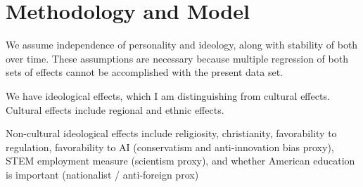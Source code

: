 \documentclass[review]{elsarticle}
\begin{document}




\section{Methodology and Model}

We assume independence of personality and ideology, along with stability of both over time.
These assumptions are necessary because multiple regression of both sets of effects cannot be accomplished with the present data set.

We have ideological effects, which I am distinguishing from cultural effects.
Cultural effects include regional and ethnic effects.

Non-cultural ideological effects include religiosity,
christianity,
favorability to regulation,
favorability to AI (conservatism and anti-innovation bias proxy),
STEM employment measure (scientism proxy),
and whether American education is important (nationalist / anti-foreign prox)
\end{document}
